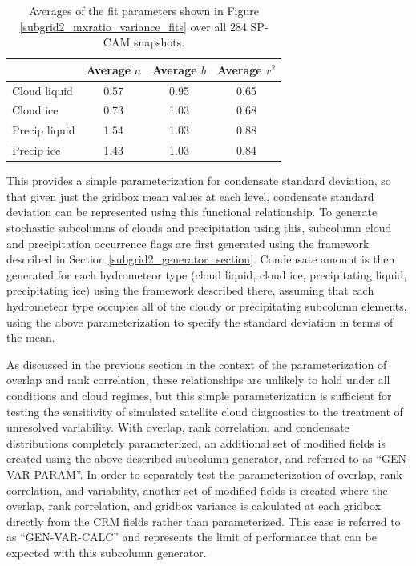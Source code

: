 \begin{table}
\centering
\begin{tabular}{lccc}
                & Average $a$  & Average $b$  & Average $r^2$ \\ \hline
Cloud liquid    & 0.57 & 0.95 & 0.65 \\
Cloud ice       & 0.73 & 1.03 & 0.68 \\
Precip liquid   & 1.54 & 1.03 & 0.88 \\
Precip ice      & 1.43 & 1.03 & 0.84 \\
\end{tabular}
\caption{Averages of the fit parameters shown in Figure \ref{subgrid2_mxratio_variance_fits} over all 284 SP-CAM snapshots.}
\label{subgrid2_mxratio_variance_fits_table}
\end{table}

This provides a simple parameterization for condensate standard deviation, so that given just the gridbox mean values at each level, condensate standard deviation can be represented using this functional relationship. To generate stochastic subcolumns of clouds and precipitation using this, subcolumn cloud and precipitation occurrence flags are first generated using the framework described in Section \ref{subgrid2_generator_section}. Condensate amount is then generated for each hydrometeor type (cloud liquid, cloud ice, precipitating liquid, precipitating ice) using the framework described there, assuming that each hydrometeor type occupies all of the cloudy or precipitating subcolumn elements, using the above parameterization to specify the standard deviation in terms of the mean.

As discussed in the previous section in the context of the parameterization of overlap and rank correlation, these relationships are unlikely to hold under all conditions and cloud regimes, but this simple parameterization is sufficient for testing the sensitivity of simulated satellite cloud diagnostics to the treatment of unresolved variability. With overlap, rank correlation, and condensate distributions completely parameterized, an additional set of modified fields is created using the above described subcolumn generator, and referred to as ``GEN-VAR-PARAM''. In order to separately test the parameterization of overlap, rank correlation, and variability, another set of modified fields is created where the overlap, rank correlation, and gridbox variance is calculated at each gridbox directly from the CRM fields rather than parameterized. This case is referred to as ``GEN-VAR-CALC'' and represents the limit of performance that can be expected with this subcolumn generator. 

